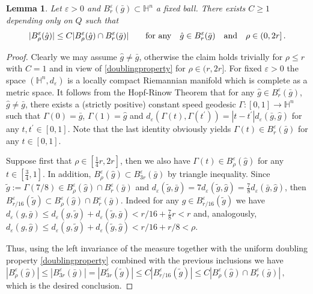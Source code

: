 \documentclass[10pt]{amsart}
\numberwithin{equation}{section}
\newtheorem{lemma}[theorem]{Lemma}
\theoremstyle{definition}
\newcommand{\He}{\mathbb{H}}
\begin{document}
\begin{lemma}
\label{uniform-density}
Let $\varepsilon>0$ and $B^\varepsilon_r(\bar{g}) \subset \He^n$ a fixed ball. There exists $C\geq 1$ depending only on $Q$ such that
\begin{equation}
\label{unif-density-bound}
|B^\varepsilon_\rho(\hat{g})| \leq C |B^\varepsilon_\rho(\hat{g}) \cap B^\varepsilon_r(\bar{g})| \qquad \hbox{for any} \quad \hat{g} \in B^\varepsilon_r(\bar{g}) \quad \hbox{and} \quad \rho\in (0,2r] \, .
\end{equation}
\end{lemma}
\begin{proof}
Clearly we may assume $\hat{g}\neq \bar{g}$, otherwise the claim holds trivially for $\rho \leq r$ with $C=1$ and in view of \eqref{doublingproperty} for $\rho \in (r,2r]$. For fixed $\varepsilon>0$ the space $(\He^n,d_\varepsilon)$ is a locally compact Riemannian manifold which is complete as a metric space. It follows from the Hopf-Rinow Theorem that for any $  \hat{g} \in B^\varepsilon_r(\bar{g}) $, $\hat{g} \neq \bar{g}$, there exists a (strictly positive) constant speed geodesic $\Gamma: [0,1] \to \He^n$ such that $\Gamma(0)=\bar{g}$, $\Gamma(1)=\hat{g}$ and $d_\varepsilon(\Gamma(t),\Gamma(t^\prime))=|t-t^\prime| d_\varepsilon(\bar{g},\hat{g})$ for any $t,t^\prime \in [0,1]$.
Note that the last identity obviously yields $\Gamma(t) \in B^\varepsilon_r(\bar{g})$ for any $t \in [0,1]$.

Suppose first that $\rho \in [\frac14 r,2r]$, then we also have $\Gamma(t) \in B^\varepsilon_\rho(\hat{g})$ for any $t \in [\frac34 ,1]$. In addition, $B^\varepsilon_\rho(\hat{g}) \subset B^\varepsilon_{3r}(\bar{g})$ by triangle inequality. Since $\tilde{g}:=\Gamma(7/8) \in B^\varepsilon_\rho(\hat{g}) \cap B^\varepsilon_r(\bar{g})$ and $d_\varepsilon(\tilde{g},\bar{g})=7d_\varepsilon(\tilde{g},\hat{g})=\frac78 d_\varepsilon(\bar{g},\hat{g})$, then $B^\varepsilon_{r/{16}}(\tilde{g}) \subset B^\varepsilon_\rho(\hat{g}) \cap B^\varepsilon_r(\bar{g}) $. Indeed  for any $g \in B^\varepsilon_{r/{16}}(\tilde{g})$ we have $d_\varepsilon(g,\bar{g}) \leq d_\varepsilon(g, \tilde{g})+d_\varepsilon(\tilde{g},\bar{g})<r/16+\frac78 r<r$ and, analogously,  $d_\varepsilon(g,\hat{g}) \leq d_\varepsilon(g, \tilde{g})+d_\varepsilon(\tilde{g},\hat{g})<r/16+r/8< \rho$. 

Thus, using the left invariance of the measure together with the uniform doubling property \eqref{doublingproperty} combined with the previous inclusions we have
$
|B^\varepsilon_\rho(\hat{g})|\leq |B^\varepsilon_{3r}(\bar{g})|=|B^\varepsilon_{3r}(\tilde{g})| \leq C |B^\varepsilon_{r/16}(\tilde{g})| \leq C  |B^\varepsilon_\rho(\hat{g}) \cap B^\varepsilon_r(\bar{g})| \, ,
$
which is the desired conclusion.


\end{proof}
\end{document}

